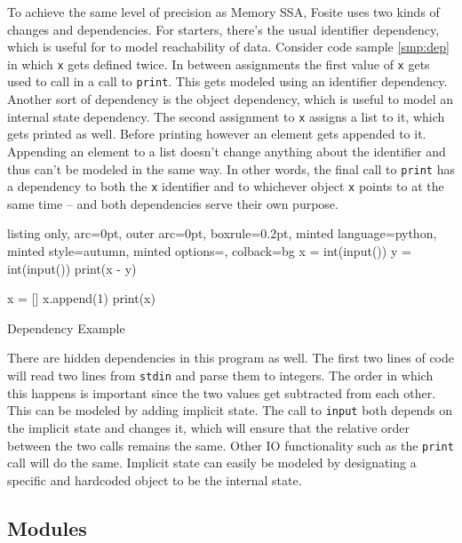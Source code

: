 \documentclass[]{article}
\begin{document}
To achieve the same level of precision as Memory SSA, Fosite uses two
kinds of changes and dependencies. For starters, there's the usual
identifier dependency, which is useful for to model reachability of
data. Consider code sample \ref{smp:dep} in which \texttt{x} gets
defined twice. In between assignments the first value of \texttt{x} gets
used to call in a call to \texttt{print}. This gets modeled using an
identifier dependency. Another sort of dependency is the object
dependency, which is useful to model an internal state dependency. The
second assignment to \texttt{x} assigns a list to it, which gets printed
as well. Before printing however an element gets appended to it.
Appending an element to a list doesn't change anything about the
identifier and thus can't be modeled in the same way. In other words,
the final call to \texttt{print} has a dependency to both the \texttt{x}
identifier and to whichever object \texttt{x} points to at the same time
-- and both dependencies serve their own purpose.

\begin{code}
  \begin{tcblisting}{listing only, 
  arc=0pt,
  outer arc=0pt, 
  boxrule=0.2pt,
  minted language=python,
  minted style=autumn,
  minted options={},
  colback=bg }
x = int(input())
y = int(input())
print(x - y)

x = []
x.append(1)
print(x)
\end{tcblisting}
\caption{Dependency Example} \label{smp:dep}
\end{code}

There are hidden dependencies in this program as well. The first two
lines of code will read two lines from \texttt{stdin} and parse them to
integers. The order in which this happens is important since the two
values get subtracted from each other. This can be modeled by adding
implicit state. The call to \texttt{input} both depends on the implicit
state and changes it, which will ensure that the relative order between
the two calls remains the same. Other IO functionality such as the
\texttt{print} call will do the same. Implicit state can easily be
modeled by designating a specific and hardcoded object to be the
internal state.

\subsection{Modules}\label{modules}
\end{document}
